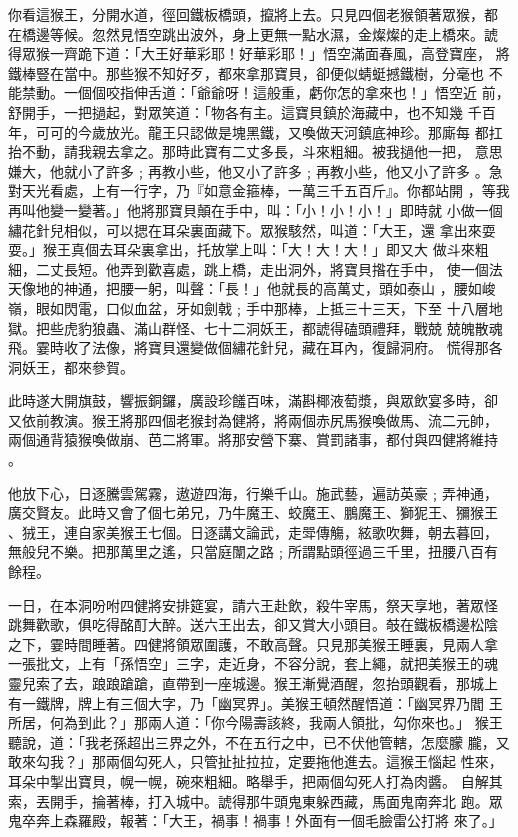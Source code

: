 \begin{pinyinscope}
{你看這猴王，分開水道，徑回鐵板橋頭，攛將上去。只見四個老猴領著眾猴，都
在橋邊等候。忽然見悟空跳出波外，身上更無一點水濕，金燦燦的走上橋來。諕
得眾猴一齊跪下道：「大王好華彩耶！好華彩耶！」悟空滿面春風，高登寶座，
將鐵棒豎在當中。那些猴不知好歹，都來拿那寶貝，卻便似蜻蜓撼鐵樹，分毫也
不能禁動。一個個咬指伸舌道：「爺爺呀！這般重，虧你怎的拿來也！」悟空近
前，舒開手，一把撾起，對眾笑道：「物各有主。這寶貝鎮於海藏中，也不知幾
千百年，可可的今歲放光。龍王只認做是塊黑鐵，又喚做天河鎮底神珍。那廝每
都扛抬不動，請我親去拿之。那時此寶有二丈多長，斗來粗細。被我撾他一把，
意思嫌大，他就小了許多﹔再教小些，他又小了許多﹔再教小些，他又小了許多
。急對天光看處，上有一行字，乃『如意金箍棒，一萬三千五百斤』。你都站開
，等我再叫他變一變著。」他將那寶貝顛在手中，叫：「小！小！小！」即時就
小做一個繡花針兒相似，可以揌在耳朵裏面藏下。眾猴駭然，叫道：「大王，還
拿出來耍耍。」猴王真個去耳朵裏拿出，托放掌上叫：「大！大！大！」即又大
做斗來粗細，二丈長短。他弄到歡喜處，跳上橋，走出洞外，將寶貝揝在手中，
使一個法天像地的神通，把腰一躬，叫聲：「長！」他就長的高萬丈，頭如泰山
，腰如峻嶺，眼如閃電，口似血盆，牙如劍戟﹔手中那棒，上抵三十三天，下至
十八層地獄。把些虎豹狼蟲、滿山群怪、七十二洞妖王，都諕得磕頭禮拜，戰兢
兢魄散魂飛。霎時收了法像，將寶貝還變做個繡花針兒，藏在耳內，復歸洞府。
慌得那各洞妖王，都來參賀。

此時遂大開旗鼓，響振銅鑼，廣設珍饈百味，滿斟椰液萄漿，與眾飲宴多時，卻
又依前教演。猴王將那四個老猴封為健將，將兩個赤尻馬猴喚做馬、流二元帥，
兩個通背猿猴喚做崩、芭二將軍。將那安營下寨、賞罰諸事，都付與四健將維持
。

他放下心，日逐騰雲駕霧，遨遊四海，行樂千山。施武藝，遍訪英豪﹔弄神通，
廣交賢友。此時又會了個七弟兄，乃牛魔王、蛟魔王、鵬魔王、獅狔王、獼猴王
、狨王，連自家美猴王七個。日逐講文論武，走斝傳觴，絃歌吹舞，朝去暮回，
無般兒不樂。把那萬里之遙，只當庭闈之路﹔所謂點頭徑過三千里，扭腰八百有
餘程。

一日，在本洞吩咐四健將安排筵宴，請六王赴飲，殺牛宰馬，祭天享地，著眾怪
跳舞歡歌，俱吃得酩酊大醉。送六王出去，卻又賞大小頭目。攲在鐵板橋邊松陰
之下，霎時間睡著。四健將領眾圍護，不敢高聲。只見那美猴王睡裏，見兩人拿
一張批文，上有「孫悟空」三字，走近身，不容分說，套上繩，就把美猴王的魂
靈兒索了去，踉踉蹌蹌，直帶到一座城邊。猴王漸覺酒醒，忽抬頭觀看，那城上
有一鐵牌，牌上有三個大字，乃「幽冥界」。美猴王頓然醒悟道：「幽冥界乃閻
王所居，何為到此？」那兩人道：「你今陽壽該終，我兩人領批，勾你來也。」
猴王聽說，道：「我老孫超出三界之外，不在五行之中，已不伏他管轄，怎麼朦
朧，又敢來勾我？」那兩個勾死人，只管扯扯拉拉，定要拖他進去。這猴王惱起
性來，耳朵中掣出寶貝，幌一幌，碗來粗細。略舉手，把兩個勾死人打為肉醬。
自解其索，丟開手，掄著棒，打入城中。諕得那牛頭鬼東躲西藏，馬面鬼南奔北
跑。眾鬼卒奔上森羅殿，報著：「大王，禍事！禍事！外面有一個毛臉雷公打將
來了。」

}
\end{pinyinscope}
